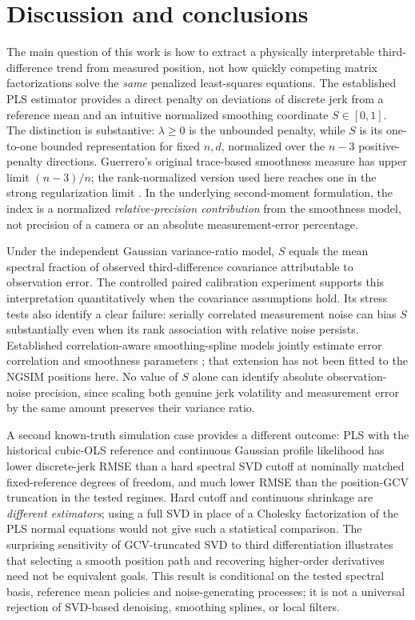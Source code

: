 \section{Discussion and conclusions}
The main question of this work is how to extract a physically
interpretable third-difference trend from measured position,
not how quickly competing matrix factorizations solve
the \emph{same} penalized least-squares equations.
The established PLS estimator provides a direct penalty
on deviations of discrete jerk from a reference mean and
an intuitive normalized smoothing coordinate $S\in[0,1]$.
The distinction is substantive: $\lambda\ge0$ is the
unbounded penalty, while $S$ is its one-to-one bounded
representation for fixed $n,d$, normalized over the
$n-3$ positive-penalty directions. Guerrero's
original trace-based smoothness measure has
upper limit $(n-3)/n$; the rank-normalized
version used here reaches one in the strong
regularization limit \citep{guerrero2007,cortes2017}.
In the underlying second-moment formulation,
the index is a normalized \emph{relative-precision
contribution} from the smoothness model,
not precision of a camera or an absolute
measurement-error percentage.

Under the independent Gaussian variance-ratio model,
$S$ equals the mean spectral fraction of observed
third-difference covariance attributable to observation
error. The controlled paired calibration experiment
supports this interpretation quantitatively when the
covariance assumptions hold. Its stress tests also
identify a clear failure: serially correlated measurement
noise can bias $S$ substantially even when its rank
association with relative noise persists. Established
correlation-aware smoothing-spline models jointly estimate
error correlation and smoothness parameters \citep{wang1998correlated};
that extension has not been fitted to the NGSIM positions here. No value
of $S$ alone can identify absolute observation-noise
precision, since scaling both genuine jerk volatility
and measurement error by the same amount preserves
their variance ratio.

A second known-truth simulation case provides a
different outcome: PLS with the historical cubic-OLS
reference and continuous Gaussian profile likelihood
has lower discrete-jerk RMSE than a hard spectral
SVD cutoff at nominally matched fixed-reference degrees
of freedom, and much lower RMSE than the position-GCV
truncation in the tested regimes. Hard cutoff and
continuous shrinkage are \emph{different estimators};
using a full SVD in place of a Cholesky factorization
of the PLS normal equations would not give such
a statistical comparison. The surprising sensitivity
of GCV-truncated SVD to third differentiation illustrates
that selecting a smooth position path and recovering
higher-order derivatives need not be equivalent goals.
This result is conditional on the tested spectral
basis, reference mean policies and noise-generating
processes; it is not a universal rejection of
SVD-based denoising, smoothing splines, or local filters.

